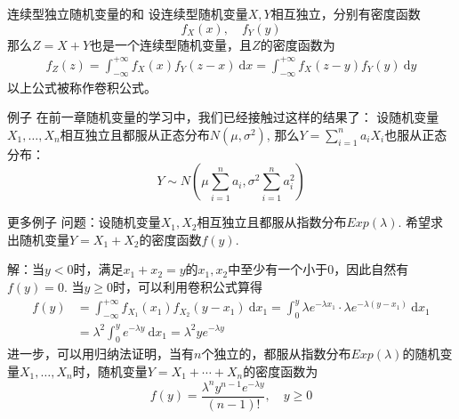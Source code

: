 
\begin{frame}

\begin{block}{连续型独立随机变量的和}
设连续型随机变量$X,Y$相互独立，分别有密度函数
\[f_X(x), \quad f_Y(y)\]
那么$Z = X+Y$也是一个连续型随机变量，且$Z$的密度函数为
\begin{align*}
f_Z(z) = \int_{-\infty}^{+\infty} f_X(x) f_Y(z-x) ~ \mathrm{d}x =
\int_{-\infty}^{+\infty} f_X(z-y) f_Y(y) ~ \mathrm{d}y
\end{align*}
以上公式被称作卷积公式。
\end{block}

\end{frame}


\begin{frame}

\begin{block}{例子}
在前一章随机变量的学习中，我们已经接触过这样的结果了：\newline
设随机变量$X_1,\ldots,X_n$相互独立且都服从正态分布$N(\mu, \sigma^2)$, 那么$Y = \sum\limits_{i=1}^n a_iX_i$也服从正态分布：
\[Y \sim N \left( \mu \sum\limits_{i=1}^n a_i, \sigma^2 \sum\limits_{i=1}^n a_i^2 \right)\]
\end{block}

\end{frame}


\begin{frame}

\begin{block}{更多例子}
问题：设随机变量$X_1,X_2$相互独立且都服从指数分布$Exp(\lambda)$. 希望求出随机变量$Y = X_1+X_2$的密度函数$f(y)$.

\vspace{1em}
\pause

解：当$y<0$时，满足$x_1+x_2=y$的$x_1,x_2$中至少有一个小于0，因此自然有$f(y) = 0$. 当$y\ge 0$时，可以利用卷积公式算得
\begin{align*}
f(y) & = \int_{-\infty}^{+\infty} f_{X_1}(x_1) f_{X_2}(y-x_1) ~ \mathrm{d}x_1 = \int_{0}^{y} \lambda e^{-\lambda x_1} \cdot \lambda e^{-\lambda (y-x_1)} ~ \mathrm{d}x_1 \\
& = \lambda^2 \int_{0}^{y} e^{-\lambda y} ~ \mathrm{d}x_1 = \lambda^2 y e^{-\lambda y}
\end{align*}
进一步，可以用归纳法证明，当有$n$个独立的，都服从指数分布$Exp(\lambda)$的随机变量$X_1,\ldots,X_n$时，随机变量$Y = X_1+\cdots+X_n$的密度函数为
\[f(y) = \dfrac{\lambda^n y^{n-1} e^{-\lambda y}}{(n-1)!}, \quad y \ge 0\]
\end{block}

\end{frame}

